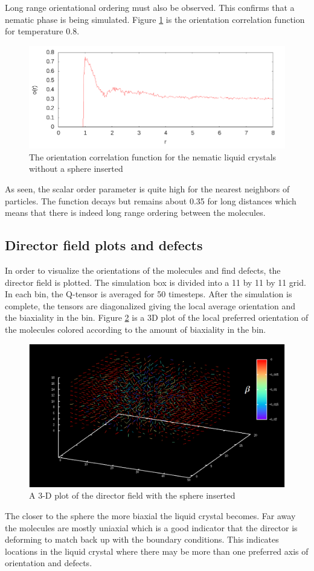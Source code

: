 \documentclass[preprint, aps]{revtex4-1}
\begin{document}
Long range orientational ordering must also be observed. This confirms that a
nematic phase is being simulated. Figure \ref{fig:ocf} is the orientation
correlation function for temperature 0.8.
	\begin{figure}[H]
		\includegraphics[width=\textwidth]{ocf.png}
		\caption{The orientation correlation function for the nematic liquid
		crystals without a sphere inserted}
		\label{fig:ocf}
	\end{figure}
As seen, the scalar order parameter is quite high for the nearest neighbors of
particles. The function decays but remains about 0.35 for long distances which
means that there is indeed long range ordering between the molecules.

\subsection*{Director field plots and defects}
In order to visualize the orientations of the molecules and find defects, the 
director field is plotted. The simulation box is divided into a 11 by 11 by 11
grid. In each bin, the Q-tensor is averaged for 50 timesteps. After the
simulation is complete, the tensors are diagonalized giving the local average
orientation and the biaxiality in the bin. Figure \ref{fig:biaxial-3d} is a 3D
plot of the local preferred orientation of the molecules colored according to
the amount of biaxiality in the bin.
	\begin{figure}[H]
		\includegraphics[width=\textwidth]{biaxial-3d.png}
		\caption{A 3-D plot of the director field with the sphere inserted}
		\label{fig:biaxial-3d}
	\end{figure}
The closer to the sphere the more biaxial the liquid crystal becomes. Far away
the molecules are mostly uniaxial which is a good indicator that the director is
deforming to match back up with the boundary conditions. This indicates
locations in the liquid crystal where there may be more than one preferred axis 
of orientation and defects.
\end{document}
